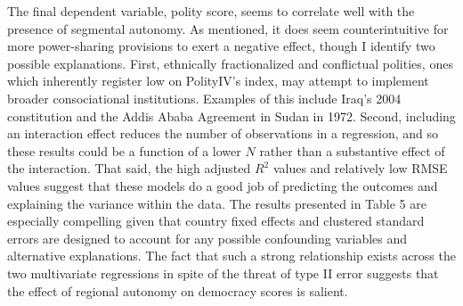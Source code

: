 \documentclass[12pt]{article}
\begin{document}
The final dependent variable, polity score, seems to correlate well with the presence of segmental autonomy. As mentioned, it does seem counterintuitive for more power-sharing provisions to exert a negative effect, though I identify two possible explanations. First, ethnically fractionalized and conflictual polities, ones which inherently register low on PolityIV's index, may attempt to implement broader consociational institutions. Examples of this include Iraq's 2004 constitution and the Addis Ababa Agreement in Sudan in 1972. Second, including an interaction effect reduces the number of observations in a regression, and so these results could be a function of a lower $N$ rather than a substantive effect of the interaction. That said, the high adjusted $R^2$ values and relatively low RMSE values suggest that these models do a good job of predicting the outcomes and explaining the variance within the data. The results presented in Table 5 are especially compelling given that country fixed effects and clustered standard errors are designed to account for any possible confounding variables and alternative explanations. The fact that such a strong relationship exists across the two multivariate regressions in spite of the threat of type II error suggests that the effect of regional autonomy on democracy scores is salient. 
\end{document}
